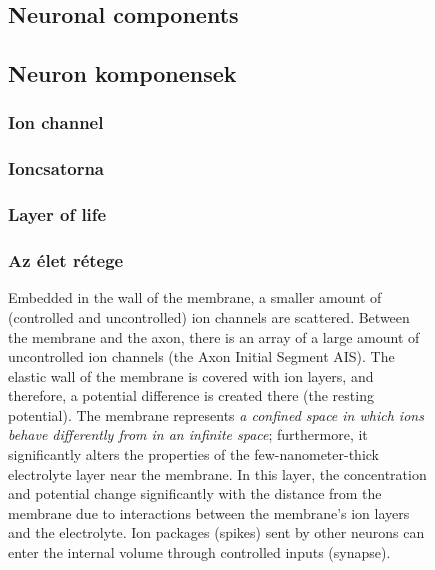\begin{figure}
\ifx\magyar\undefined
\subsection[Components]{Neuronal components \label{sec:AbstractComponents}}

\else

\subsection[Komponensek]{Neuron komponensek \label{sec:AbstractComponents}}
\fi

\ifx\magyar\undefined
\subsubsection[Ion channel]{Ion channel\label{sec:AbstractIonChannel}}

\else

\subsubsection[Ioncsatorna]{Ioncsatorna\label{sec:AbstractIonChannel}}
\fi



\ifx\magyar\undefined
\subsubsection[Electrolyte layer]{Layer of life\label{sec:AbstractLayer}}

\else

\subsubsection[Elektrolitréteg]{Az élet rétege\label{sec:AbstractLayer}}
\fi


\ifx\magyar\undefined

Embedded in the wall of the membrane, a smaller amount of (controlled 
and uncontrolled) ion channels are scattered.
Between the membrane and the axon, there is an array of a large amount of uncontrolled ion channels (the Axon Initial Segment \gls{AIS}). 
The elastic wall of the membrane is covered with ion layers, and therefore, a potential difference is created there (the resting potential).
The membrane represents \textit{a confined space in which ions behave differently from in an infinite space}; furthermore, it significantly alters the properties of the few-nanometer-thick electrolyte layer near the membrane. In this layer, the concentration and potential change significantly with the distance from the membrane due to interactions between the membrane's ion layers and the electrolyte.
Ion packages (spikes) sent by other neurons can enter the internal volume through controlled inputs (synapse).


\end{figure}
